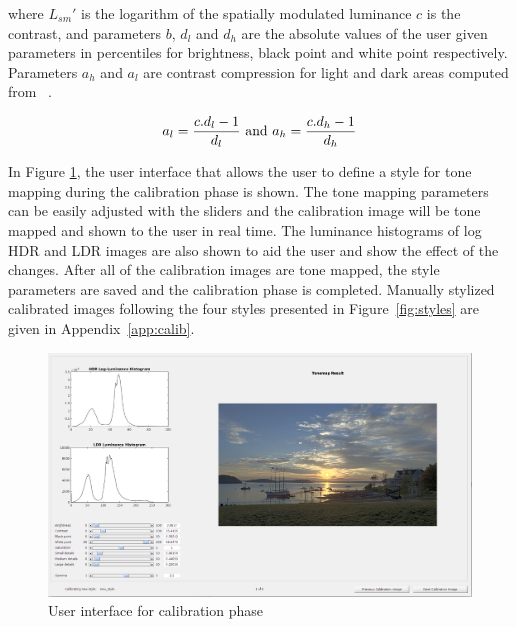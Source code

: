 where $L_{sm}'$ is the logarithm of the spatially modulated luminance $c$ is the contrast, and parameters $b$, $d_l$ and $d_h$ are the absolute values of the user given parameters in percentiles for brightness, black point and white point respectively. Parameters $a_h$ and $a_l$ are contrast compression for light and dark areas computed from ~\cite{mantiuk2008modeling}.

\begin{equation}
    a_l = {{c . d_l-1} \over {d_l}} \text{ and } a_h = {{c . d_h-1} \over {d_h}}
\end{equation}

In Figure \ref{fig:calibration_phase}, the user interface that allows the user to define a style for tone mapping during the calibration phase is shown. The tone mapping parameters can be easily adjusted with the sliders and the calibration image will be tone mapped and shown to the user in real time. The luminance histograms of log HDR and LDR images are also shown to aid the user and show the effect of the changes. After all of the calibration images are tone mapped, the style parameters are saved and the calibration phase is completed. Manually stylized calibrated images following the four styles presented in Figure~\ref{fig:styles} are given in Appendix~\ref{app:calib}.

\begin{landscape}
\begin{figure}
\begin{center}
\includegraphics[height=0.85\textwidth]{figures/chapter5/ui_screenshot.png}
\caption{User interface for calibration phase}
\label{fig:calibration_phase}
\end{center}
\end{figure}
\end{landscape}

